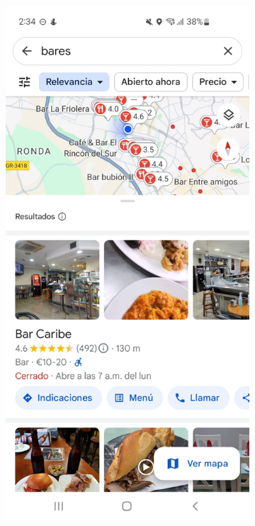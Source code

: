 \begin{figure}[H]
    \centering

    \begin{subfigure}{.3\textwidth}
        \centering
        \includegraphics[width=\linewidth]{imagenes/GoogleMaps.jpeg}

\end{subfigure}
\end{figure}
